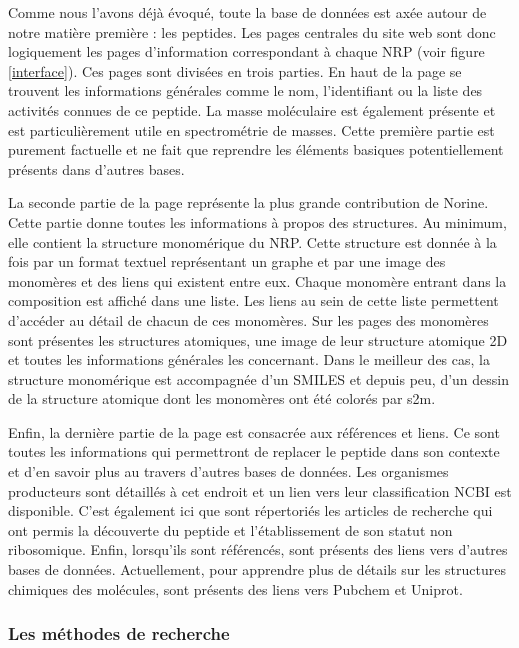 Comme nous l'avons déjà évoqué, toute la base de données est axée autour de notre matière première : les peptides.
Les pages centrales du site web sont donc logiquement les pages d'information correspondant à chaque NRP (voir figure \ref{interface}).
Ces pages sont divisées en trois parties.
En haut de la page se trouvent les informations générales comme le nom, l'identifiant ou la liste des activités connues de ce peptide.
La masse moléculaire est également présente et est particulièrement utile en spectrométrie de masses.
Cette première partie est purement factuelle et ne fait que reprendre les éléments basiques potentiellement présents dans d'autres bases.

La seconde partie de la page représente la plus grande contribution de Norine.
Cette partie donne toutes les informations à propos des structures.
Au minimum, elle contient la structure monomérique du NRP.
Cette structure est donnée à la fois par un format textuel représentant un graphe et par une image des monomères et des liens qui existent entre eux.
Chaque monomère entrant dans la composition est affiché dans une liste.
Les liens au sein de cette liste permettent d'accéder au détail de chacun de ces monomères.
Sur les pages des monomères sont présentes les structures atomiques, une image de leur structure atomique 2D et toutes les informations générales les concernant.
Dans le meilleur des cas, la structure monomérique est accompagnée d'un SMILES et depuis peu, d'un dessin de la structure atomique dont les monomères ont été colorés par s2m.

Enfin, la dernière partie de la page est consacrée aux références et liens.
Ce sont toutes les informations qui permettront de replacer le peptide dans son contexte et d'en savoir plus au travers d'autres bases de données.
Les organismes producteurs sont détaillés à cet endroit et un lien vers leur classification NCBI est disponible.
C'est également ici que sont répertoriés les articles de recherche qui ont permis la découverte du peptide et l'établissement de son statut non ribosomique.
Enfin, lorsqu'ils sont référencés, sont présents des liens vers d'autres bases de données.
Actuellement, pour apprendre plus de détails sur les structures chimiques des molécules, sont présents des liens vers Pubchem et Uniprot.


\subsubsection{Les méthodes de recherche}

